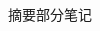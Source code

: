 \documentclass{article}
\begin{document}
\begin{CJK}{UTF8}{gkai}

摘要部分笔记






\end{CJK}


\end{document}
